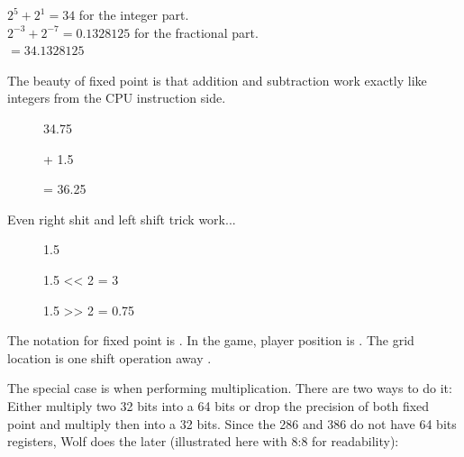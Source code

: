 $ 2^5 + 2^1 = 34 $ for the integer part.\\
$ 2^{-3}+2^{-7} = 0.1328125 $ for the fractional part.\\
$ = 34.1328125$\\

\bigskip

The beauty of fixed point is that addition and subtraction work exactly like integers from the CPU instruction side.\\




\par
\begin{figure}[H]
 \centering
   

   \caption{34.75} 
\end{figure} 

\begin{figure}[H]
 \centering
   
  \caption{+ 1.5} 
\end{figure} 

\begin{figure}[H]
 \centering
   
  {\caption{= 36.25}}
\end{figure} 
\par
 Even right shit and left shift trick work...\\
 
 \par
\begin{figure}[H]
 \centering
   
   \caption{1.5} 
\end{figure} 

\par
\begin{figure}[H]
 \centering
   
   \caption{1.5 << 2  = 3} 
\end{figure}

\par
\begin{figure}[H]
 \centering
   
   \caption{1.5 >> 2 = 0.75} 
\end{figure}

The notation for fixed point is . In the game, player position is . The grid location is one shift operation away .\\
\par
 The special case is when performing multiplication. There are two ways to do it: Either multiply two 32 bits into a 64 bits or drop the precision of both fixed point and multiply then into a 32 bits. Since the 286 and 386 do not have 64 bits registers, Wolf does the later (illustrated here with 8:8 for readability):


